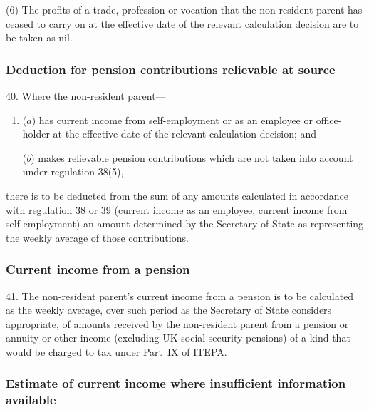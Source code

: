 \documentclass[12pt,a4paper]{article}
\begin{document}
(6) The profits of a trade, profession or vocation that the non-resident parent has ceased to carry on at the effective date of the relevant calculation decision are to be taken as nil.

\subsubsection[40. Deduction for pension contributions relievable at source]{Deduction for pension contributions relievable at source}

40.  Where the non-resident parent—
\begin{enumerate}\item[]
($a$) has current income from self-employment or as an employee or office-holder at the effective date of the relevant calculation decision; and

($b$) makes relievable pension contributions which are not taken into account under regulation 38(5),
\end{enumerate}
there is to be deducted from the sum of any amounts calculated in accordance with regulation 38 or 39 (current income as an employee, current income from self-employment) an amount determined by the Secretary of State as representing the weekly average of those contributions.

\subsubsection[41. Current income from a pension]{Current income from a pension}

41.  The non-resident parent’s current income from a pension is to be calculated as the weekly average, over such period as the Secretary of State considers appropriate, of amounts received by the non-resident parent from a pension or annuity or other income (excluding UK social security pensions) of a kind that would be charged to tax under Part~IX of ITEPA.

\subsubsection[42. Estimate of current income where insufficient information available]{Estimate of current income where insufficient information available}
\end{document}
